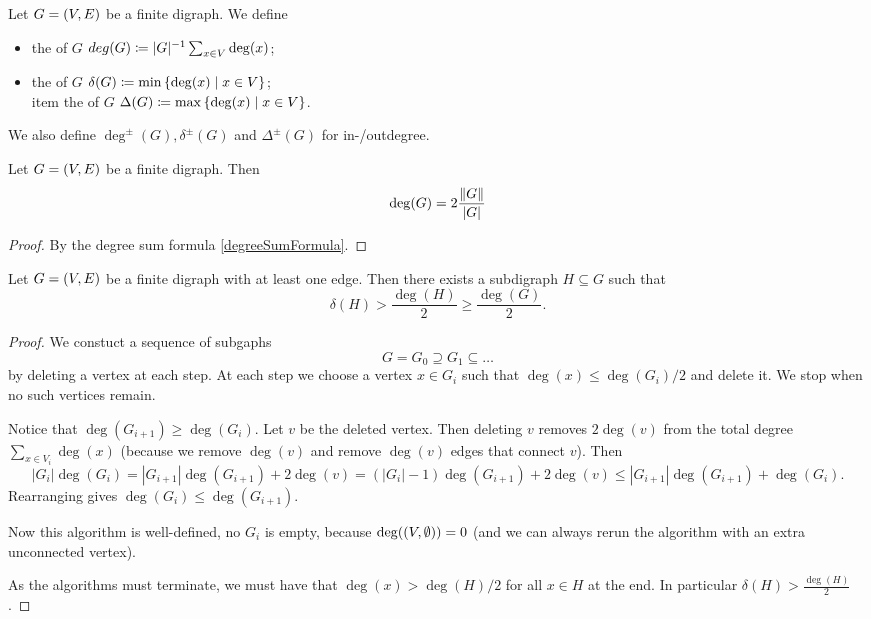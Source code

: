 \begin{definition}
Let $G = \left( V,E \right)$ be a finite digraph. We define
\begin{itemize}
\item the  of $G$ $deg(G) \coloneqq |G|^{-1}\sum_{x\in V}\deg(x)$;
\item the  of $G$ $\delta(G) \coloneqq \min\left\{ \deg(x) \;\middle|\; x\in V \right\}$;
\\item the  of $G$ $\Delta(G) \coloneqq \max\left\{ \deg(x) \;\middle|\; x\in V \right\}$.
\end{itemize}
We also define $\deg^\pm(G), \delta^\pm(G)$ and $\Delta^\pm(G)$ for in-/outdegree.
\end{definition}

\begin{lemma}
Let $G = \left( V,E \right)$ be a finite digraph. Then
\[ \deg(G) = 2\frac{\lVert G\rVert}{|G|} \]
\end{lemma}
\begin{proof}
By the degree sum formula \ref{degreeSumFormula}.
\end{proof}

\begin{proposition}
Let $G = \left( V,E \right)$ be a finite digraph with at least one edge. Then there exists a subdigraph $H \subseteq G$ such that
\[ \delta(H) > \frac{\deg(H)}{2} \geq \frac{\deg(G)}{2}. \]
\end{proposition}
\begin{proof}
We constuct a sequence of subgaphs
\[ G = G_0 \supseteq G_1 \subseteq \ldots \]
by deleting a vertex at each step. At each step we choose a vertex $x\in G_i$ such that $\deg(x) \leq \deg(G_i)/2$ and delete it. We stop when no such vertices remain.

Notice that $\deg(G_{i+1}) \geq \deg(G_i)$. Let $v$ be the deleted vertex. Then deleting $v$ removes $2\deg(v)$ from the total degree $\sum_{x\in V_i}\deg(x)$ (because we remove $\deg(v)$ and remove $\deg(v)$ edges that connect $v$). Then
\[ |G_i|\deg(G_{i}) = |G_{i+1}|\deg(G_{i+1}) + 2\deg(v) = (|G_{i}|-1)\deg(G_{i+1}) + 2\deg(v) \leq |G_{i+1}|\deg(G_{i+1}) + \deg(G_i). \]
Rearranging gives $\deg(G_i) \leq \deg(G_{i+1})$.

Now this algorithm is well-defined, no $G_i$ is empty, because $\deg(\left( V, \emptyset \right)) = 0$ (and we can always rerun the algorithm with an extra unconnected vertex).

As the algorithms must terminate, we must have that $\deg(x) > \deg(H)/2$ for all $x\in H$ at the end. In particular $\delta(H) > \frac{\deg(H)}{2}$.
\end{proof}


